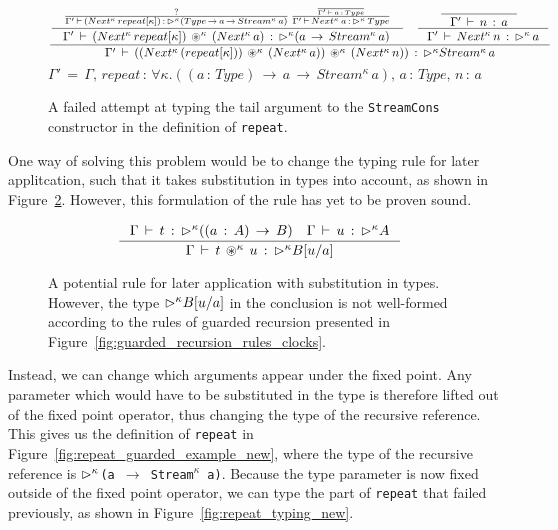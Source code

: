 \begin{figure}[h]
\centering
\[
\frac { \begin{matrix} \inference { \frac { ? }{ \Gamma '\, \vdash \, (Next^{\kappa}\,repeat[\kappa])\, :\, \later
        ^{\kappa}(Type\, \rightarrow \, a\, \rightarrow \, Stream^{\kappa}\, a) } \, 
      \frac {
        \frac {  }{ \Gamma '\, \vdash \, a\, :\, Type } 
      }
      { \Gamma '\, \vdash \,
        Next^{\kappa}\, a\, :\, \later ^{\kappa}\, Type }
    }{ \, \Gamma '\, \vdash \, (Next^{\kappa}\,repeat[\kappa])\,
      \tensor ^{\kappa} \, (Next^{\kappa}\, a)\, :\, \later ^{\kappa}(a\, \rightarrow \, Stream^{\kappa}\,
      a)\ }  & \inference { \inference {  }{ \Gamma '\, \vdash \, n\, :\, a }  }{
      \Gamma '\, \vdash \, Next^{\kappa}\, n\, :\, \later ^{\kappa} \, a }  \end{matrix} }{
  \Gamma '\, \vdash \, ((Next^{\kappa}\,(repeat[\kappa]))\, \tensor ^{\kappa} \, (Next^{\kappa}\, a))\, \tensor ^{\kappa} \,
  (Next^{\kappa}\, n))\, :\, \later ^{\kappa} Stream^{\kappa}\, a }
\]
\[
\Gamma '\, =\, \Gamma ,\, repeat\, :\, \forall\kappa.((a\, :\, Type)\, \rightarrow \,
a\, \rightarrow \, Stream^{\kappa}\, a),\, a\, :\, Type,\, n\, :\, a
\]
  \caption{A failed attempt at typing the tail argument to the
    \texttt{StreamCons} constructor in the definition of \texttt{repeat}.}
  \label{fig:repeat_failed_typing}
\end{figure}

One way of solving this problem would be to change the typing rule for later applitcation, such that it takes substitution in types into account, as shown in
Figure~\ref{fig:tensor_with_subst}. However, this formulation of the rule has
yet to be proven sound.

\begin{figure}[h]
\[
\inference { \Gamma \, \vdash \, t\, :\, \later^{\kappa} ((a\, :\, A)\,
  \rightarrow \, B)\quad \Gamma \, \vdash \, u\, :\, \later^{\kappa} A }{
  \Gamma \, \vdash \, t\, \tensor ^{\kappa} \, u\, :\, \later^{\kappa} B[{ u
  }/{ a }] } 
\]
  \caption{A potential rule for later application with substitution in
    types. However, the type $\rhd^{\kappa} B[{ u }/{ a }]$ in the conclusion
    is not well-formed according to the rules of guarded recursion presented in Figure~\ref{fig:guarded_recursion_rules_clocks}.}
  \label{fig:tensor_with_subst}
\end{figure}

Instead, we can change which arguments appear under the fixed point. Any
parameter which would have to be substituted in the type is therefore lifted out
of the fixed point operator, thus changing the type of the recursive
reference. This gives us the definition of \texttt{repeat} in
Figure~\ref{fig:repeat_guarded_example_new}, where the type of the recursive
reference is \texttt{$\rhd ^{\kappa}$(a~$\rightarrow$~Stream$^{\kappa}$
  a)}. Because the type parameter is now fixed outside of the fixed point
operator, we can type the part of \texttt{repeat} that failed previously, as
shown in Figure~\ref{fig:repeat_typing_new}.


